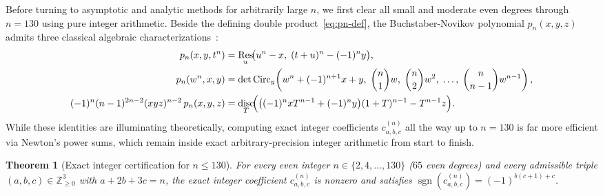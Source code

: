 \documentclass[10pt]{article}
\numberwithin{equation}{section}
\theoremstyle{plain}
\newtheorem{theorem}{Theorem}[section]
\theoremstyle{definition}
\newcommand{\Z}{\mathbb{Z}}
\newcommand{\1}{\mathbf{1}}
\DeclareMathOperator{\sgn}{sgn}
\DeclareMathOperator{\Res}{Res}
\DeclareMathOperator{\disc}{disc}
\begin{document}
Before turning to asymptotic and analytic methods for arbitrarily large $n$, we first clear all small and moderate even degrees through $n = 130$ using pure integer arithmetic. Beside the defining double product~\eqref{eq:pn-def}, the Buchstaber-Novikov polynomial $p_n(x, y, z)$ admits three classical algebraic characterizations~\cite{BK2023,GRvS2024,BKor2025}:
\begin{subequations}\label{eq:classical-reps}
\begin{align}
p_n(x, y, t^n) &= \Res_u\!\bigl(u^n - x,\; (t + u)^n - (-1)^n y\bigr), \label{eq:rep-res} \\
p_n(w^n, x, y) &= \det\mathrm{Circ}_y\!\left(w^n + (-1)^{n+1} x + y,\; \binom{n}{1}w,\; \binom{n}{2}w^2,\; \dots,\; \binom{n}{n-1}w^{n-1}\right), \label{eq:rep-wendt} \\
(-1)^n (n - 1)^{2n - 2} (xyz)^{n - 2}\, p_n(x, y, z) &= \disc_T\!\Bigl(\bigl((-1)^n x T^{n-1} + (-1)^n y\bigr)(1 + T)^{n-1} - T^{n-1} z\Bigr). \label{eq:rep-disc}
\end{align}
\end{subequations}
While these identities are illuminating theoretically, computing exact integer coefficients $c_{a,b,c}^{(n)}$ all the way up to $n = 130$ is far more efficient via Newton's power sums, which remain inside exact arbitrary-precision integer arithmetic from start to finish.

\begin{theorem}[Exact integer certification for $n \le 130$]\label{thm:base}
For every even integer $n \in \{2, 4, \dots, 130\}$ ($65$ even degrees) and every admissible triple $(a, b, c) \in \Z_{\ge 0}^3$ with $a + 2b + 3c = n$, the exact integer coefficient $c_{a,b,c}^{(n)}$ is nonzero and satisfies $\sgn(c_{a,b,c}^{(n)}) = (-1)^{b(c+1)+c}$.
\end{theorem}
\end{document}
